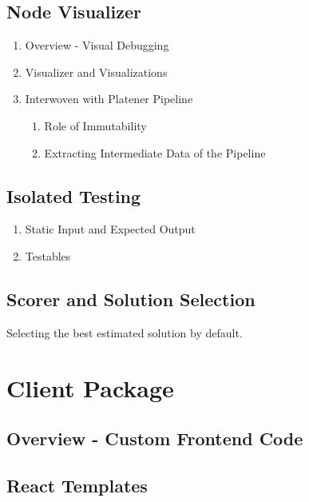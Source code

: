 \documentclass[../ClassicThesis.tex]{subfiles}
\begin{document}
\subsection{Node Visualizer}


\begin{enumerate}
\item Overview - Visual Debugging


\item Visualizer and Visualizations


\item Interwoven with Platener Pipeline


  \begin{enumerate}
  \item Role of Immutability


  \item Extracting Intermediate Data of the Pipeline

  \end{enumerate}
\end{enumerate}

\subsection{Isolated Testing}


\begin{enumerate}
\item Static Input and Expected Output


\item Testables

\end{enumerate}

\subsection{Scorer and Solution Selection}


Selecting the best estimated solution by default.

\section{Client Package}


\subsection{Overview - Custom Frontend Code}


\subsection{React Templates}
\end{document}
